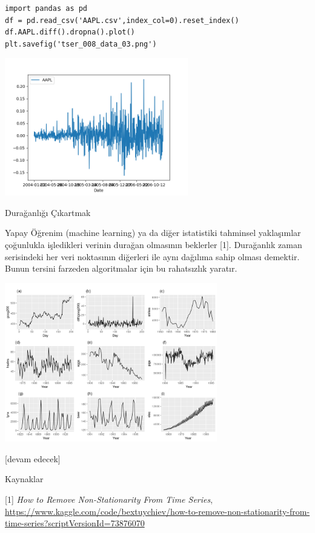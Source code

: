 \documentclass[12pt,fleqn]{article}\usepackage{../../common}
\begin{document}
\begin{verbatim}
import pandas as pd
df = pd.read_csv('AAPL.csv',index_col=0).reset_index()
df.AAPL.diff().dropna().plot()
plt.savefig('tser_008_data_03.png')
\end{verbatim}

\includegraphics[height=6cm]{tser_008_data_03.png}



Durağanlığı Çıkartmak

Yapay Öğrenim (machine learning) ya da diğer istatistiki tahminsel yaklaşımlar
çoğunlukla işledikleri verinin durağan olmasının beklerler [1]. Durağanlık
zaman serisindeki her veri noktasının diğerleri ile aynı dağılıma sahip olması
demektir. Bunun tersini farzeden algoritmalar için bu rahatsızlık yaratır. 

\includegraphics[width=25em]{tser_008_data_01.png}











[devam edecek]

Kaynaklar

[1] {\em How to Remove Non-Stationarity From Time Series},
    \url{https://www.kaggle.com/code/bextuychiev/how-to-remove-non-stationarity-from-time-series?scriptVersionId=73876070}
\end{document}
